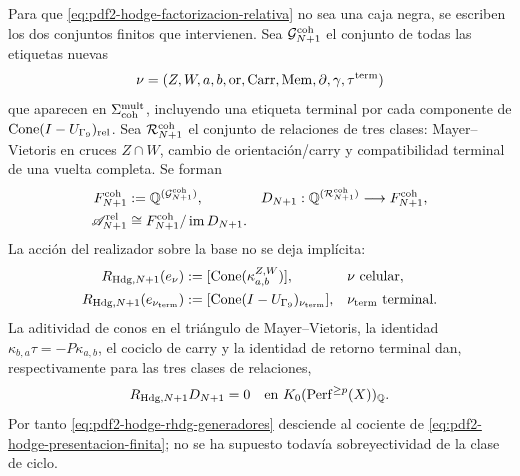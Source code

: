 Para que \eqref{eq:pdf2-hodge-factorizacion-relativa} no sea una caja negra,
se escriben los dos conjuntos finitos que intervienen. Sea
\(\mathcal G_{N+1}^{\rm coh}\) el conjunto de todas las etiquetas nuevas
\[
 \nu=(Z,W,a,b,\operatorname{or},\operatorname{Carr},
       \operatorname{Mem},\partial,\gamma,\tau^{\rm term})
\]
que aparecen en \(\Sigma_{\rm coh}^{\rm mult}\), incluyendo una etiqueta
terminal por cada componente de
\(\operatorname{Cone}(I-U_{\Gamma_9})_{\rm rel}\). Sea
\(\mathcal R_{N+1}^{\rm coh}\) el conjunto de relaciones de tres clases:
Mayer--Vietoris en cruces \(Z\cap W\), cambio de orientación/carry y
compatibilidad terminal de una vuelta completa. Se forman
\begin{equation}\label{eq:pdf2-hodge-presentacion-finita}
\begin{aligned}
 F_{N+1}^{\rm coh}&:=\mathbb Q^{(\mathcal G_{N+1}^{\rm coh})},&
 D_{N+1}&:\mathbb Q^{(\mathcal R_{N+1}^{\rm coh})}
             \longrightarrow F_{N+1}^{\rm coh},\\
 \mathscr A_{N+1}^{\rm rel}
   &\cong F_{N+1}^{\rm coh}/\operatorname{im}D_{N+1}.&&
\end{aligned}
\end{equation}
La acción del realizador sobre la base no se deja implícita:
\begin{equation}\label{eq:pdf2-hodge-rhdg-generadores}
\begin{aligned}
 R_{{\rm Hdg},N+1}(e_\nu)
   &:=[\operatorname{Cone}(\kappa_{a,b}^{Z,W})],
       &&\nu\ \text{celular},\\
 R_{{\rm Hdg},N+1}(e_{\nu_{\rm term}})
   &:=[\operatorname{Cone}(I-U_{\Gamma_9})_{\nu_{\rm term}}],
       &&\nu_{\rm term}\ \text{terminal}.
\end{aligned}
\end{equation}
La aditividad de conos en el triángulo de Mayer--Vietoris, la identidad
\(\kappa_{b,a}\tau=-P\kappa_{a,b}\), el cociclo de carry y la identidad de
retorno terminal dan, respectivamente para las tres clases de relaciones,
\begin{equation}\label{eq:pdf2-hodge-descenso-relaciones}
 R_{{\rm Hdg},N+1}D_{N+1}=0
 \quad\text{en }K_0(\operatorname{Perf}^{\ge p}(X))_{\mathbb Q}.
\end{equation}
Por tanto \eqref{eq:pdf2-hodge-rhdg-generadores} desciende al cociente de
\eqref{eq:pdf2-hodge-presentacion-finita}; no se ha supuesto todavía
sobreyectividad de la clase de ciclo.


